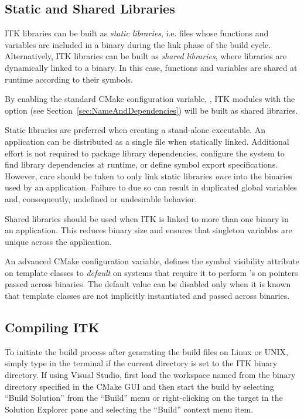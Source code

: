 \subsection{Static and Shared Libraries}
\label{sec:StaticSharedLibraries}

ITK libraries can be built as \textit{static libraries}, i.e. files whose
functions and variables are included in a binary during the link phase of
the build cycle. Alternatively, ITK libraries can be built as
\textit{shared libraries}, where libraries are dynamically linked to a
binary. In this case, functions and variables are shared at runtime according
to their symbols.

By enabling the standard CMake configuration variable,
, ITK modules with the  option
(see Section~\ref{sec:NameAndDependencies}) will be built as shared libraries.

Static libraries are preferred when creating a stand-alone executable. An
application can be distributed as a single file when statically linked.
Additional effort is not required to package library dependencies, configure the
system to find library dependencies at runtime, or define symbol export
specifications. However, care should be taken to only link static libraries
\textit{once} into the binaries used by an application. Failure to due so can
result in duplicated global variables and, consequently, undefined or
undesirable behavior.

Shared libraries should be used when ITK is linked to more than one binary in
an application. This reduces binary size and ensures that singleton
variables are unique across the application.

An advanced CMake configuration variable,
 defines the symbol visibility
attribute on template classes to \textit{default} on systems that require it
to perform 's on pointers passed across binaries. The
default value can be disabled only when it is known that template classes are
not implicitly instantiated and passed across binaries.


\subsection{Compiling ITK}
\label{sec:BuildITK}


To initiate the build process after generating the build files on Linux or UNIX,
simply type  in the terminal if the current directory is set to the
ITK binary directory. If using Visual Studio, first load the workspace named
 from the binary directory specified in the CMake GUI and then
start the build by selecting ``Build Solution'' from the ``Build'' menu
or right-clicking on the  target in the Solution Explorer pane
and selecting the ``Build'' context menu item.

